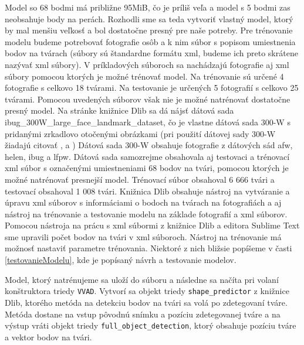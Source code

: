 Model so 68 bodmi má približne 95MiB, čo je príliš veľa a model s 5 bodmi zas neobsahuje body na perách.
Rozhodli sme sa teda vytvoriť vlastný model, ktorý by mal menšiu veľkosť a bol dostatočne presný pre naše potreby.
Pre trénovanie modelu budeme potrebovať fotografie osôb a k nim súbor s popisom umiestnenia bodov na tvárach (súbory sú štandardne formátu xml, budeme ich preto skrátene nazývať xml súbory).
V príkladových súboroch sa nachádzajú fotografie aj xml súbory pomocou ktorých je možné trénovať model.
Na trénovanie sú určené 4 fotografie s celkovo 18 tvárami.
Na testovanie je určených 5 fotografií s celkovo 25 tvárami.
Pomocou uvedených súborov však nie je možné natrénovať dostatočne presný model.
Na stránke knižnice Dlib sa dá nájsť dátová sada ibug\_300W\_large\_face\_landmark\_dataset, čo je vlastne dátová sada 300-W \cite{ibug} s pridanými zrkadlovo otočenými obrázkami (pri použití dátovej sady  300-W \cite{ibug} žiadajú citovať \cite{sagonas2016300}, \cite{sagonas2013300} a \cite{sagonas2013semi}) 
Dátová sada  300-W \cite{ibug} obsahuje fotografie z dátových sád afw, helen, ibug a lfpw. 
Dátová sada samozrejme obsahovala aj testovaci a trénovací xml súbor s označenými umiestneniami 68 bodov na tvári, pomocou ktorých je možné natrénovať presnejší model.
Trénovací súbor obsahoval 6 666 tvári a testovací obsahoval 1 008 tvári.
Knižnica Dlib obsahuje nástroj na vytváranie a úpravu xml súborov s informáciami o bodoch na tvárach na fotografiách a aj nástroj na trénovanie a testovanie modelu na základe fotografií a xml súborov.
Pomocou nástroja na prácu s xml súbormi z knižnice Dlib a editora Sublime Text sme upravili počet bodov na tvári v xml súboroch.
Nástroj na trénovanie má možnosť nastaviť parametre trénovania.
Niektoré z nich bližsie popíšeme v časti \ref{testovanieModelu}, kde je popísaný návrh a testovanie modelov.

Model, ktorý natrénujeme sa uloží do súboru a následne sa načíta pri volaní konštruktora triedy \texttt{VVAD}.
Vytvorí sa objekt triedy \texttt{shape\_predictor} z knižnice Dlib, ktorého metóda na detekciu bodov na tvári sa volá po zdetegovaní tváre.
Metóda dostane na vstup pôvodnú snímku a pozíciu zdetegovanej tváre a na výstup vráti objekt triedy \texttt{full\_object\_detection}, ktorý obsahuje pozíciu tváre a vektor bodov na tvári.

